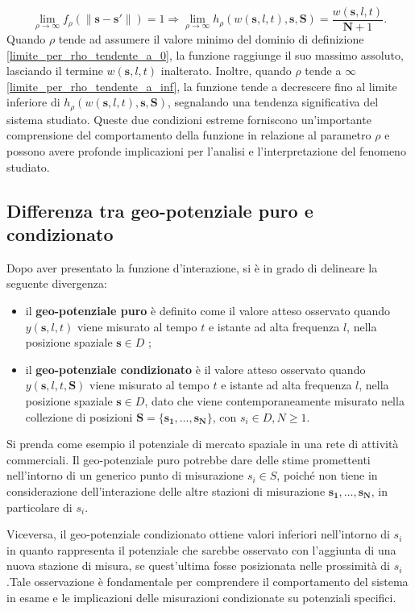 \begin{equation}
	\lim_{\rho \to \infty} f_\rho(\|\mathbf{s} - \mathbf{s'}\|) = 1
	\Rightarrow \lim_{\rho \to \infty} h_\rho(w(\mathbf{s}, l, t), \mathbf{s}, \mathbf{S}) = \frac{w(\mathbf{s}, l, t)}{\mathbf{N} + 1} .
	\label{limite_per_rho_tendente_a_inf}
\end{equation}
Quando $\rho$ tende ad assumere il valore minimo del dominio di definizione \ref{limite_per_rho_tendente_a_0}, la funzione raggiunge il suo massimo assoluto, lasciando il termine $w(\mathbf{s}, l, t)$ inalterato. Inoltre, quando 
$\rho$ tende a $\infty$  \ref{limite_per_rho_tendente_a_inf}, la funzione tende a decrescere fino al limite inferiore di $h_\rho(w(\mathbf{s}, l, t), \mathbf{s}, \mathbf{S})$, segnalando una tendenza significativa del sistema studiato. Queste due condizioni estreme forniscono un'importante comprensione del comportamento della funzione in relazione al parametro $\rho$ e possono avere profonde implicazioni per l'analisi e l'interpretazione del fenomeno studiato.

\subsection[Differenza tra geo-potenziale puro e condizionato]{Differenza tra geo-potenziale puro e condizionato}
Dopo aver presentato la funzione d'interazione, si è in grado di delineare la seguente divergenza:
\begin{itemize}
	\item il \textbf{geo-potenziale puro} è definito come  il valore atteso osservato quando $y(\mathbf{s}, l, t)$ viene misurato al tempo $t$ e istante ad alta frequenza $l$, nella posizione spaziale $\mathbf{s} \in D$ ;
	\item il \textbf{geo-potenziale condizionato} è il valore atteso osservato quando $y(\mathbf{s}, l, t, \mathbf{S})$
	viene misurato al tempo $t$ e istante ad alta frequenza $l$, nella posizione spaziale $\mathbf{s} \in D$, dato che viene contemporaneamente misurato nella collezione di posizioni $\mathbf{S} = \{\mathbf{s_1}, \ldots, \mathbf{s_N}\}$,  con $s_i \in D, N \geq 1$.
\end{itemize}
	Si prenda come esempio il potenziale di mercato spaziale in  una rete di attività commerciali. Il geo-potenziale puro potrebbe dare delle stime promettenti nell'intorno di un generico punto di misurazione $s_i \in S$, poiché non tiene in considerazione dell'interazione delle altre stazioni di misurazione $\mathbf{s_1}, \ldots, \mathbf{s_N}$, in particolare di $s_i$.
	\par Viceversa, il geo-potenziale condizionato ottiene valori inferiori nell'intorno di $s_i$ in quanto rappresenta il potenziale che sarebbe osservato con l'aggiunta di una  nuova stazione di misura, se quest'ultima fosse posizionata nelle prossimità di $s_i$.Tale osservazione è fondamentale per comprendere il comportamento del sistema in esame e le implicazioni delle misurazioni condizionate su potenziali specifici.


